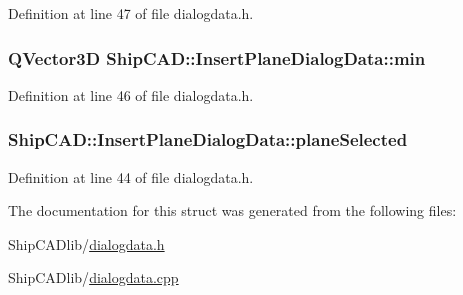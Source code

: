 Definition at line 47 of file dialogdata.\+h.

\subsubsection[{\texorpdfstring{min}{min}}]{\setlength{\rightskip}{0pt plus 5cm}Q\+Vector3D Ship\+C\+A\+D\+::\+Insert\+Plane\+Dialog\+Data\+::min}\hypertarget{structShipCAD_1_1InsertPlaneDialogData_a27431ce232112ee8c3c01cdc5eaba7fd}{}\label{structShipCAD_1_1InsertPlaneDialogData_a27431ce232112ee8c3c01cdc5eaba7fd}


Definition at line 46 of file dialogdata.\+h.

\subsubsection[{\texorpdfstring{plane\+Selected}{planeSelected}}]{ Ship\+C\+A\+D\+::\+Insert\+Plane\+Dialog\+Data\+::plane\+Selected}\hypertarget{structShipCAD_1_1InsertPlaneDialogData_aa028c61547384932261d4a8b647f9eeb}{}\label{structShipCAD_1_1InsertPlaneDialogData_aa028c61547384932261d4a8b647f9eeb}


Definition at line 44 of file dialogdata.\+h.



The documentation for this struct was generated from the following files\+:\begin{DoxyCompactItemize}
\item 
Ship\+C\+A\+Dlib/\hyperlink{dialogdata_8h}{dialogdata.\+h}\item 
Ship\+C\+A\+Dlib/\hyperlink{dialogdata_8cpp}{dialogdata.\+cpp}\end{DoxyCompactItemize}
